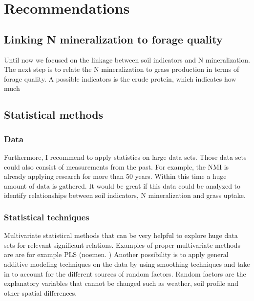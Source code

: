 \documentclass[10pt,twoside,dutch,english]{report}
\begin{document}
\chapter{Recommendations}

	\section{Linking N mineralization to forage quality}
Until now we focused on the linkage between soil indicators and N mineralization. The next step is to relate the N mineralization to grass production in terms of forage quality. A possible indicators is the crude protein, which indicates how much 

	
    
\section{Statistical methods}

	 \subsection{Data}
Furthermore, I recommend to apply statistics on large data sets. Those data sets could also consist of measurements from the past. For example, the NMI is already applying research for more than 50 years. Within this time a huge amount of data is gathered. It would be great if this data could be analyzed to identify relationships between soil indicators, N mineralization and grass uptake. 

	\subsection{Statistical techniques}
	Multivariate statistical methods that can be very helpful to explore huge data sets for relevant significant relations. Examples of proper multivariate methods are  are for example PLS (noemen. ) Another possibility is to apply general additive modeling techniques on the data by using smoothing techniques and take in to account for the different sources of random factors. Random factors are the explanatory variables that cannot be changed such as weather, soil profile and other spatial differences. 
\end{document}
